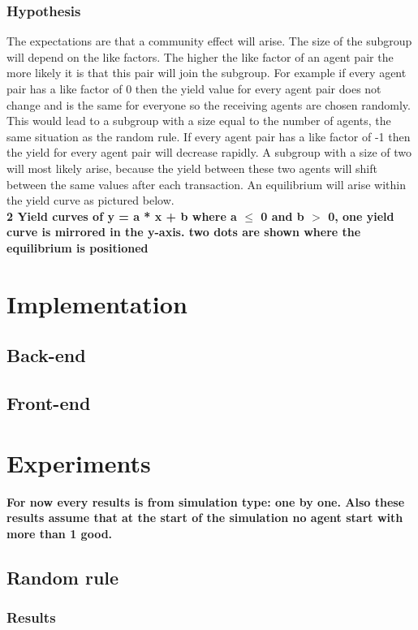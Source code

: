\documentclass[twoside,openright]{uva-bachelor-thesis}
\begin{document}
\subsection{Hypothesis}
The expectations are that a community effect will arise. The size of the subgroup will depend on the like factors. The higher the like factor of an agent pair the more likely it is that this pair will join the subgroup. For example if every agent pair has a like factor of 0 then the yield value for every agent pair does not change and is the same for everyone so the receiving agents are chosen randomly. This would lead to a subgroup with a size equal to the number of agents, the same situation as the random rule. If every agent pair has a like factor of -1 then the yield for every agent pair will decrease rapidly. A subgroup with a size of two will most likely arise, because the yield between these two agents will shift between the same values after each transaction. An equilibrium will arise within the yield curve as pictured below. \\
\textbf{2 Yield curves of y = a * x + b where a $\le$ 0 and b $>$ 0, one yield curve is mirrored in the y-axis. two dots are shown where the equilibrium is positioned}

\chapter{Implementation}

\section{Back-end}

\section{Front-end}

\chapter{Experiments}
\textbf{For now every results is from simulation type: one by one. Also these results assume that at the start of the simulation no agent start with more than 1 good.}
\section{Random rule}

\subsection{Results}
\end{document}
